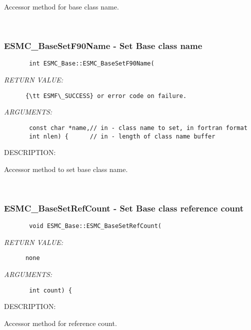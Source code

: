        Accessor method for base class name.
   
 
\mbox{}\hrulefill\
 
\subsubsection [ESMC\_BaseSetF90Name] {ESMC\_BaseSetF90Name - Set Base class name}


  
\begin{verbatim}       int ESMC_Base::ESMC_BaseSetF90Name(\end{verbatim}{\em RETURN VALUE:}
\begin{verbatim}      {\tt ESMF\_SUCCESS} or error code on failure.\end{verbatim}{\em ARGUMENTS:}
\begin{verbatim}       const char *name,// in - class name to set, in fortran format
       int nlen) {      // in - length of class name buffer\end{verbatim}
{\sf DESCRIPTION:\\ }


       Accessor method to set base class name.
   
 
\mbox{}\hrulefill\
 
\subsubsection [ESMC\_BaseSetRefCount] {ESMC\_BaseSetRefCount - Set Base class reference count}


  
\begin{verbatim}       void ESMC_Base::ESMC_BaseSetRefCount(\end{verbatim}{\em RETURN VALUE:}
\begin{verbatim}      none\end{verbatim}{\em ARGUMENTS:}
\begin{verbatim}       int count) {\end{verbatim}
{\sf DESCRIPTION:\\ }


       Accessor method for reference count.
   
 
